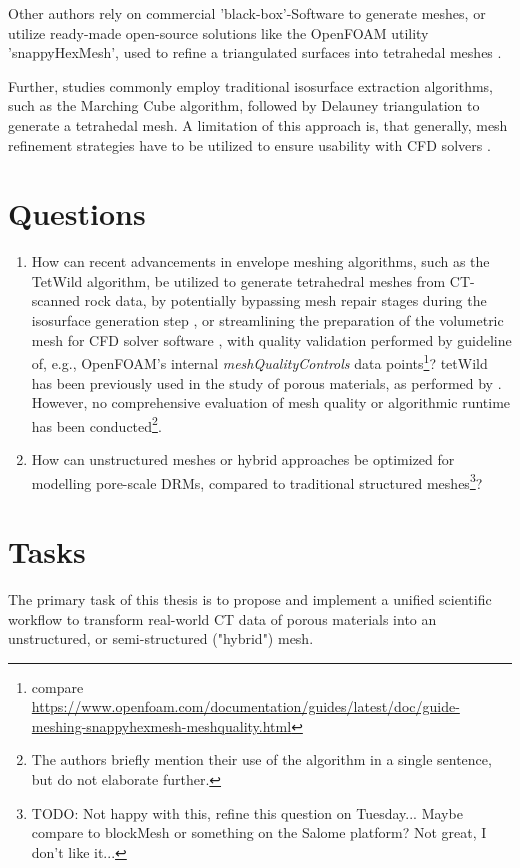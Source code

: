 \documentclass[
	ngerman,
	accentcolor=9c,
	type=intern,
	marginpar=false
	]{tudapub}
\begin{document}
Other authors rely on commercial 'black-box'-Software to generate meshes, or utilize ready-made open-source solutions like the OpenFOAM utility 'snappyHexMesh', used to refine a triangulated surfaces into tetrahedal meshes \cite{icardi_pore-scale_2014, guibert_computational_2015}.

Further, studies commonly employ traditional isosurface extraction algorithms, such as the Marching Cube algorithm, followed by Delauney triangulation to generate a tetrahedal mesh. A limitation of this approach is, that generally, mesh refinement strategies have to be utilized to ensure usability with CFD solvers \cite{zhou_novel_2017}.\par

\section{Questions}
\begin{enumerate}
	\item How can recent advancements in envelope meshing algorithms, such as the TetWild algorithm, be utilized to generate tetrahedral meshes from CT-scanned rock data, by potentially bypassing mesh repair stages during the isosurface generation step \cite{icardi_pore-scale_2014}, or streamlining the preparation of the volumetric mesh for CFD solver software \cite{zhou_novel_2017}, with quality validation performed by guideline of, e.g., OpenFOAM's internal \textit{meshQualityControls} data points\footnote{compare \url{https://www.openfoam.com/documentation/guides/latest/doc/guide-meshing-snappyhexmesh-meshquality.html}}? tetWild has been previously used in the study of porous materials, as performed by \textcite{velasquez-parra_phase_2024}. However, no comprehensive evaluation of mesh quality or algorithmic runtime has been conducted\footnote{The authors briefly mention their use of the algorithm in a single sentence, but do not elaborate further.}.
	
	\item How can unstructured meshes or hybrid approaches be optimized for modelling pore-scale  DRMs, compared to traditional structured meshes\footnote{TODO: Not happy with this, refine this question on Tuesday... Maybe compare to blockMesh or something on the Salome platform? Not great, I don't like it...}?
\end{enumerate}

\section{Tasks}
The primary task of this thesis is to propose and implement a unified scientific workflow to transform real-world CT data of porous materials into an unstructured, or semi-structured ("hybrid") mesh.\par
\end{document}
